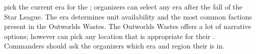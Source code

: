  pick the current era for the ; organizers can select any era after the fall of the Star League.
The era determines unit availability and the most common factions present in the Outworlds Wastes.
The Outworlds Wastes offers a lot of narrative options; however  can pick any location that is appropriate for their .
Commanders should ask the organizers which era and region their  is in.
